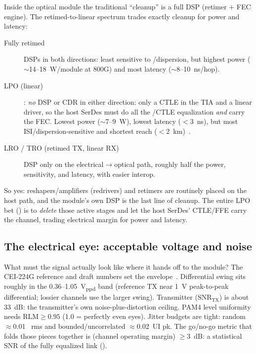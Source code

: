 Inside the optical module the traditional ``cleanup'' is a full DSP (retimer $+$
FEC engine). The retimed-to-linear spectrum trades exactly cleanup for power and
latency:
\begin{description}
\item[Fully retimed] DSPs in both directions: least sensitive to /dispersion,
      but highest power ($\sim$14--18~W/module at 800G) and most latency
      ($\sim$8--10~ns/hop).
\item[LPO (linear)] : \emph{no} DSP or CDR in either direction: only a CTLE in the
      TIA and a linear driver, so the host SerDes must do all the /CTLE
      equalization \emph{and} carry the FEC. Lowest power ($\sim$7--9~W), lowest
      latency ($<$3~ns), but most ISI/dispersion-sensitive and shortest reach
      ($<$2~km)~\cite{lpo}.
\item[LRO / TRO (retimed TX, linear RX)] DSP only on the electrical$\to$optical
      path, roughly half the power, sensitivity, and latency, with easier interop.
\end{description}

So yes: reshapers/amplifiers (redrivers) and retimers are routinely placed on the
host path, and the module's own DSP is the last line of cleanup. The entire LPO bet
() is to \emph{delete} those active stages and let the host SerDes'
CTLE/FFE carry the channel, trading electrical margin for power and latency.

\subsection{The electrical eye: acceptable voltage and noise}
\label{sec:eye-budget}

What must the signal actually look like where it hands off to the module? The
CEI-224G reference and draft numbers set the envelope~\cite{cei224}. Differential
swing sits roughly in the 0.36--1.05~V\textsubscript{ppd} band (reference TX near
1~V peak-to-peak differential; lossier channels use the larger swing). Transmitter
 ($\mathrm{SNR_{TX}}$) is about 33~dB: the transmitter's own
noise-plus-distortion ceiling. PAM4 level uniformity needs
$\mathrm{RLM}\ge0.95$ (1.0 = perfectly even eyes). Jitter budgets are tight:
random $\approx$0.01~ rms and bounded/uncorrelated
$\approx$0.02~UI pk. The go/no-go metric that folds those pieces together is
 (channel operating margin) $\ge3$~dB: a statistical SNR of
the fully equalized link ().

